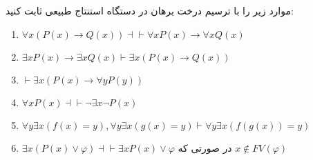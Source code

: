 
	موارد زیر را با ترسیم درخت برهان در دستگاه استنتاج طبیعی ثابت کنید:
	\begin{enumerate}[label=(\alph*)]
		\item 
			$\forall x (P(x) \to Q(x)) \dashv\vdash \forall x P(x) \to \forall x Q(x)$
		\item 
			$\exists x P(x) \to \exists x Q(x) \vdash \exists x(P(x) \to Q(x))$
		\item 
			$\vdash \exists x (P(x) \to \forall y P(y))$
		\item
			$\forall x P(x) \dashv\vdash \neg \exists x \neg 	P(x)$
		\item
			$\forall y \exists x (f(x) = y), \forall y \exists x (g(x) = y) \vdash \forall y \exists x (f(g(x)) = y)$
		\item
			$\exists x(P(x) \vee \varphi) \dashv\vdash \exists x P(x) \vee \varphi$
			در صورتی که
			$x \notin FV(\varphi)$
	\end{enumerate}
